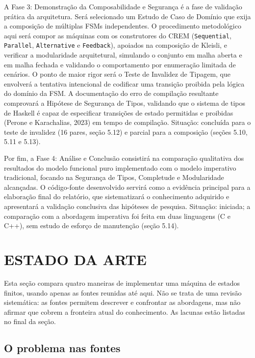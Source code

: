 \documentclass[12pt,a4paper]{article}
\begin{document}
A Fase 3: Demonstração da Composabilidade e Segurança é a fase de validação prática da arquitetura. Será selecionado um Estudo de Caso de Domínio que exija a composição de múltiplas FSMs independentes. O procedimento metodológico aqui será compor as máquinas com os construtores do CREM (\texttt{Sequential}, \texttt{Parallel}, \texttt{Alternative} e \texttt{Feedback}), apoiados na composição de Kleisli, e verificar a modularidade arquitetural, simulando o conjunto em malha aberta e em malha fechada e validando o comportamento por enumeração limitada de cenários. O ponto de maior rigor será o Teste de Invalidez de Tipagem, que envolverá a tentativa intencional de codificar uma transição proibida pela lógica do domínio da FSM. A documentação do erro de compilação resultante comprovará a Hipótese de Segurança de Tipos, validando que o sistema de tipos de Haskell é capaz de especificar transições de estado permitidas e proibidas (Perone e Karachalias, 2023) em tempo de compilação. Situação: concluída para o teste de invalidez (16 pares, seção 5.12) e parcial para a composição (seções 5.10, 5.11 e 5.13).

Por fim, a Fase 4: Análise e Conclusão consistirá na comparação qualitativa dos resultados do modelo funcional puro implementado com o modelo imperativo tradicional, focando na Segurança de Tipos, Completude e Modularidade alcançadas. O código-fonte desenvolvido servirá como a evidência principal para a elaboração final do relatório, que sistematizará o conhecimento adquirido e apresentará a validação conclusiva das hipóteses de pesquisa. Situação: iniciada; a comparação com a abordagem imperativa foi feita em duas linguagens (C e C++), sem estudo de esforço de manutenção (seção 5.14).

\section{ESTADO DA ARTE}

Esta seção compara quatro maneiras de implementar uma máquina de estados finitos, usando apenas as fontes reunidas até aqui. Não se trata de uma revisão sistemática: as fontes permitem descrever e confrontar as abordagens, mas não afirmar que cobrem a fronteira atual do conhecimento. As lacunas estão listadas no final da seção.

\subsection{O problema nas fontes}
\end{document}
